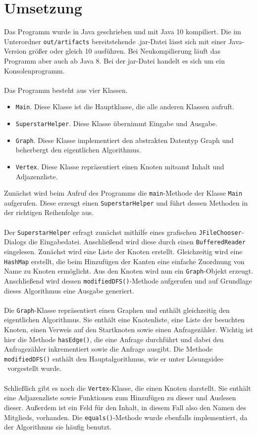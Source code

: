 \documentclass[a4paper, notitlepage, 12pt]{scrartcl}
\begin{document}
\section{Umsetzung}
Das Programm wurde in Java geschrieben und mit Java 10 kompiliert. Die im Unterordner \texttt{out/artifacts} bereitstehende .jar-Datei lässt sich mit einer Java-Version größer oder gleich 10 ausführen. Bei Neukompilierung läuft das Programm aber auch ab Java 8. Bei der jar-Datei handelt es sich um ein Konsolenprogramm. \\ \\
Das Programm besteht aus vier Klassen.
\begin{itemize}
  \item \texttt{Main}. Diese Klasse ist die Hauptklasse, die alle anderen Klassen aufruft.
  \item \texttt{SuperstarHelper}. Diese Klasse übernimmt Eingabe und Ausgabe.
  \item \texttt{Graph}. Diese Klasse implementiert den abstrakten Datentyp Graph und beherbergt den eigentlichen Algorithmus.
  \item \texttt{Vertex}. Diese Klasse repräsentiert einen Knoten mitsamt Inhalt und Adjazenzliste.
\end{itemize}

Zunächst wird beim Aufruf des Programms die \texttt{main}-Methode der Klasse \texttt{Main} aufgerufen. Diese erzeugt einen \texttt{SuperstarHelper} und führt dessen Methoden in der richtigen Reihenfolge aus. \\ \\
Der \texttt{SuperstarHelper} erfragt zunächst mithilfe eines grafischen \texttt{JFileChooser}-Dialogs die Eingabedatei. Anschließend wird diese durch einen \texttt{BufferedReader} eingelesen. Zunächst wird eine Liste der Knoten erstellt. Gleichzeitig wird eine \texttt{HashMap} erstellt, die beim Hinzufügen der Kanten eine einfache Zuordnung von Name zu Knoten ermöglicht. Aus den Knoten wird nun ein \texttt{Graph}-Objekt erzeugt. Anschließend wird dessen \texttt{modifiedDFS()}-Methode aufgerufen und auf Grundlage dieses Algorithmus eine Ausgabe generiert. \\ \\
Die \texttt{Graph}-Klasse repräsentiert einen Graphen und enthält gleichzeitig den eigentlichen Algorithmus. Sie enthält eine Knotenliste, eine Liste der besuchten Knoten, einen Verweis auf den Startknoten sowie einen Anfragezähler. Wichtig ist hier die Methode \texttt{hasEdge()}, die eine Anfrage durchführt und dabei den Anfragezähler inkrementiert sowie die Anfrage ausgibt. Die Methode \texttt{modifiedDFS()} enthält den Hauptalgorithmus, wie er unter \glqq Lösungsidee \grqq ~vorgestellt wurde. \\ \\
Schließlich gibt es noch die \texttt{Vertex}-Klasse, die einen Knoten darstellt. Sie enthält eine Adjazenzliste sowie Funktionen zum Hinzufügen zu dieser und Auslesen dieser. Außerdem ist ein Feld für den Inhalt, in diesem Fall also den Namen des Mitglieds, vorhanden. Die \texttt{equals()}-Methode wurde ebenfalls implementiert, da der Algorithmus sie häufig benutzt.
\end{document}
